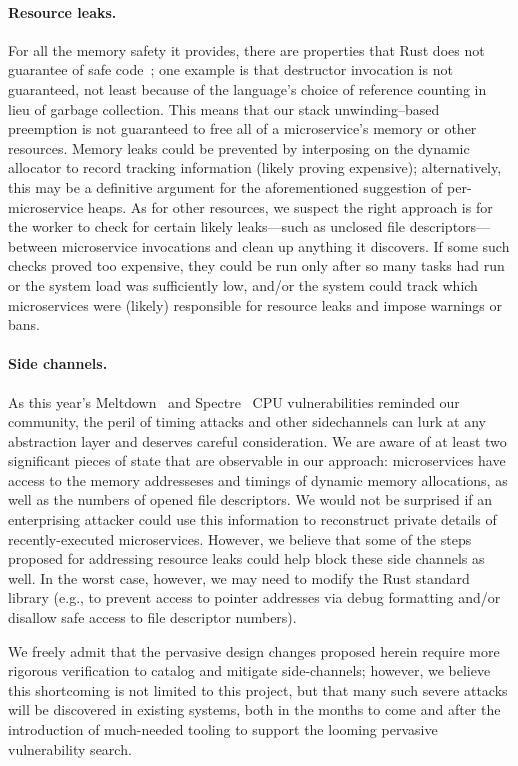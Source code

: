 \paragraph{Resource leaks.}
For all the memory safety it provides, there are properties that Rust does not
guarantee of safe code~\cite{www-rustlang-nu}; one example is that destructor
invocation is not guaranteed, not least because of the language's choice of reference
counting in lieu of garbage collection.  This means that our stack unwinding--based
preemption is not guaranteed to free all of a microservice's memory or other
resources.  Memory leaks could be prevented by interposing on the dynamic allocator
to record tracking information (likely proving expensive); alternatively, this may be
a definitive argument for the aforementioned suggestion of per-microservice heaps.
As for other resources, we suspect the right approach is for the worker to check for
certain likely leaks---such as unclosed file descriptors---between microservice
invocations and clean up anything it discovers.  If some such checks proved too
expensive, they could be run only after so many tasks had run or the system load was
sufficiently low, and/or the system could track which microservices were (likely)
responsible for resource leaks and impose warnings or bans.

\paragraph{Side channels.}
As this year's Meltdown~\cite{Lipp2018} and Spectre~\cite{Kocher2018} CPU
vulnerabilities reminded our community, the peril of timing attacks and other
sidechannels can lurk at any abstraction layer and deserves careful consideration.
We are aware of at least two significant pieces of state that are observable in our
approach: microservices have access to the memory addresseses and timings of dynamic
memory allocations, as well as the numbers of opened file descriptors.  We would not
be surprised if an enterprising attacker could use this information to reconstruct
private details of recently-executed microservices.  However, we believe that some of
the steps proposed for addressing resource leaks could help block these side
channels as well.  In the worst case, however, we may need to modify the Rust
standard library (e.g., to prevent access to pointer addresses via debug formatting
and/or disallow safe access to file descriptor numbers).

We freely admit that the pervasive design changes proposed herein require more
rigorous verification to catalog and mitigate side-channels; however, we believe this
shortcoming is not limited to this project, but that many such severe attacks will be
discovered in existing systems, both in the months to come and after the introduction
of much-needed tooling to support the looming pervasive vulnerability search.

